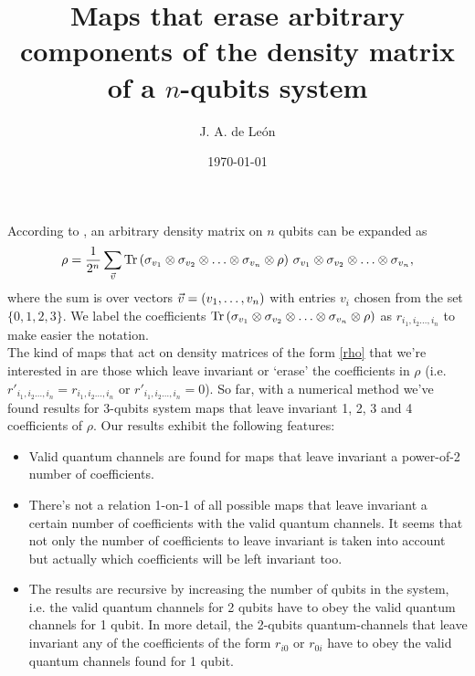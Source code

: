 \documentclass[11pt]{article}
\begin{document}
\title{Maps that erase arbitrary components of the density matrix of a $n$-qubits system} %
\author{J. A. de Le\'on} %


\date{\today}  %

\maketitle  %


According to \cite{nielsen_chuang_2011}, an arbitrary density matrix on $n$ qubits can be expanded as
\begin{align}
	\rho = \frac{1}{2^n}\sum _{\vec{v}} \Tr \qty( \sigma _{v_1} \otimes \sigma_{v_2} \otimes \ldots \otimes \sigma_{v_n} \otimes \rho )\  \sigma _{v_1} \otimes \sigma_{v_2} \otimes \ldots \otimes \sigma_{v_n},
	\label{rho}
\end{align}
where the sum is over vectors $\vec{v}=\qty(v_1,\ldots, v_n)$ with entries $v_i$ chosen from the set $\{0,1,2,3\}$. We label the coefficients $\Tr \qty( \sigma _{v_1} \otimes \sigma_{v_2} \otimes \ldots \otimes \sigma_{v_n} \otimes \rho )$ as $r_{i_1, i_2\ldots, i_n}$ to make easier the notation. \\

The kind of maps that act on density matrices of the form \eqref{rho} that we're interested in are those which leave invariant or `erase' the coefficients in $\rho$ (i.e. $r'_{i_1, i_2\ldots, i_n}=r_{i_1, i_2\ldots, i_n}$ or $r'_{i_1, i_2\ldots, i_n}=0$). So far, with a numerical method we've found results for 3-qubits system maps that leave invariant 1, 2, 3 and 4 coefficients of $\rho$. Our results exhibit the following features:
\begin{itemize}
	\item Valid quantum channels are found for maps that leave invariant a power-of-2 number of coefficients.
	\item There's not a relation 1-on-1 of all possible maps that leave invariant a certain number of coefficients with the valid quantum channels. It seems that not only the number of coefficients to leave invariant is taken into account but actually which coefficients will be left invariant too.
	\item The results are recursive by increasing the number of qubits in the system, i.e. the valid quantum channels for 2 qubits have to obey the valid quantum channels for 1 qubit. In more detail, the 2-qubits quantum-channels that leave invariant any of the coefficients of the form $r_{i0}$ or $r_{0i}$ have to obey the valid quantum channels found for 1 qubit.
\end{itemize}
\end{document}
